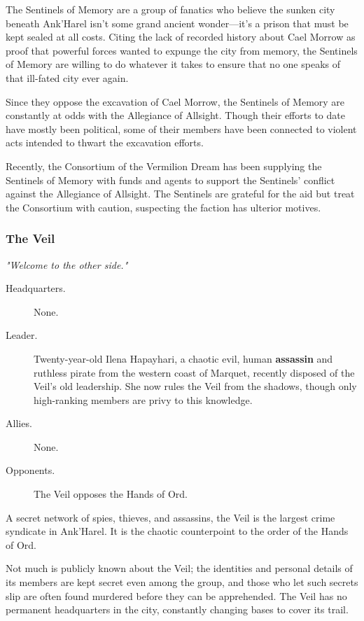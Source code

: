\documentclass[10pt,a4paper,twoside,bg=print,twocolumn,openany,nodeprecatedcode]{dndbook}
\begin{document}
The Sentinels of Memory are a group of fanatics who believe the sunken city beneath Ank'Harel isn't some grand ancient wonder—it's a prison that must be kept sealed at all costs. Citing the lack of recorded history about Cael Morrow as proof that powerful forces wanted to expunge the city from memory, the Sentinels of Memory are willing to do whatever it takes to ensure that no one speaks of that ill-fated city ever again.

Since they oppose the excavation of Cael Morrow, the Sentinels of Memory are constantly at odds with the Allegiance of Allsight. Though their efforts to date have mostly been political, some of their members have been connected to violent acts intended to thwart the excavation efforts.

Recently, the Consortium of the Vermilion Dream has been supplying the Sentinels of Memory with funds and agents to support the Sentinels' conflict against the Allegiance of Allsight. The Sentinels are grateful for the aid but treat the Consortium with caution, suspecting the faction has ulterior motives.

\subsubsection{The Veil}
\textit{"Welcome to the other side."}


\begin{description}
\item[Headquarters.]
None.
\item[Leader.]
Twenty-year-old Ilena Hapayhari, a chaotic evil, human \textbf{assassin} and ruthless pirate from the western coast of Marquet, recently disposed of the Veil's old leadership. She now rules the Veil from the shadows, though only high-ranking members are privy to this knowledge.
\item[Allies.]
None.
\item[Opponents.]
The Veil opposes the Hands of Ord.
\end{description}

A secret network of spies, thieves, and assassins, the Veil is the largest crime syndicate in Ank'Harel. It is the chaotic counterpoint to the order of the Hands of Ord.

Not much is publicly known about the Veil; the identities and personal details of its members are kept secret even among the group, and those who let such secrets slip are often found murdered before they can be apprehended. The Veil has no permanent headquarters in the city, constantly changing bases to cover its trail.
\end{document}
